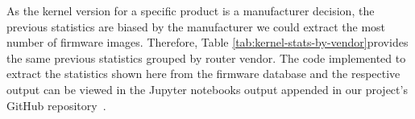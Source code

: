 As the kernel version for a specific product is a manufacturer decision, the previous statistics are biased by the manufacturer we could extract the most number of firmware images. Therefore, Table \ref{tab:kernel-stats-by-vendor}provides the same previous statistics grouped by router vendor. The code implemented to extract the statistics shown here from the firmware database and the respective output can be viewed in the Jupyter notebooks output appended in our project's GitHub repository~\cite{github:c2dc-toso}. 

\begin{table}[H]
\centering
\caption{Five most common kernel versions found in extracted firmware images by vendor.}
\end{table}
